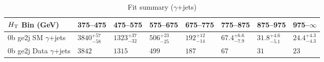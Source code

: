 \documentclass[8pt]{article}
\def\scalht{\mbox{$H_{\rm{T}}$}\xspace}
\newcommand\T{\rule{0pt}{2.6ex}}
\begin{document}
\begin{table}[ht!]
\caption{Fit summary ($\gamma$+jets)}
\label{tab:ensemble-summary}
\centering
\begin{tabular}{ llllllll }

\hline
\scalht Bin (GeV)       & 375--475                       & 475--575                       & 575--675                       & 675--775                       & 775--875                       & 875--975                       & 975--$\infty$                  \\ [1.000000ex]
\hline
0b ge2j SM $\gamma$+jets\T & $3840^{+57}_{-58}$             & $1323^{+37}_{-32}$             & $506^{+23}_{-25}$              & $192^{+12}_{-14}$              & $67.4^{+6.6}_{-7.9}$           & $31.8^{+4.6}_{-5.1}$           & $24.4^{+4.3}_{-4.3}$           \\ 
0b ge2j Data $\gamma$+jets\T & $3842$                         & $1315$                         & $499$                          & $187$                          & $67$                           & $31$                           & $23$                           \\ 
\hline

\end{tabular}
\end{table}
\end{document}
